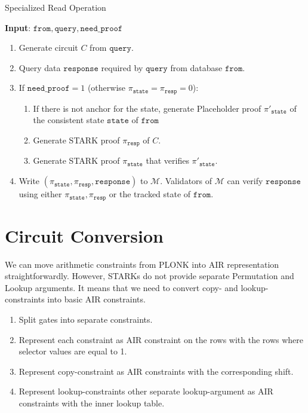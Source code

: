 \begin{algorithm}[h]
\caption{Specialized Read Operation}
\textbf{Input}: $\texttt{from}, \texttt{query}, \texttt{need\_proof}$
\begin{enumerate}
	\item Generate circuit $C$ from $\texttt{query}$.
	\item Query data $\texttt{response}$ required by $\texttt{query}$ from database $\texttt{from}$.
	\item If $\texttt{need\_proof} = 1$ (otherwise $\pi_{\texttt{state}} = \pi_{\texttt{resp}} = 0$):
	\begin{enumerate}
		\item If there is not anchor for the state, 
            generate Placeholder proof $\pi'_{\texttt{state}}$ of the consistent state $\texttt{state}$ of $\texttt{from}$
		\item Generate STARK proof $\pi_{\texttt{resp}}$ of $C$.
		\item Generate STARK proof $\pi_{\texttt{state}}$ that verifies $\pi'_{\texttt{state}}$.
	\end{enumerate}
	\item Write $(\pi_{\texttt{state}}, \pi_{\texttt{resp}}, \texttt{response})$ to $\mathcal{M}$.
			Validators of $\mathcal{M}$ can verify $\texttt{response}$ using either $\pi_{\texttt{state}}, \pi_{\texttt{resp}}$ or the tracked state of $\texttt{from}$. 
\end{enumerate}
\end{algorithm}

\section{Circuit Conversion}

We can move arithmetic constraints from PLONK into AIR representation straightforwardly. 
However, STARKs do not provide separate Permutation and Lookup arguments.
It means that we need to convert copy- and lookup-constraints into 
basic AIR constraints.  
\begin{enumerate}
    \item Split gates into separate constraints.
    \item Represent each constraint as AIR constraint on the rows with the rows where selector values are equal to 1.
    \item Represent copy-constraint as AIR constraints with the corresponding shift. 
    \item Represent lookup-constraints other separate lookup-argument as AIR constraints with the inner lookup table. 
\end{enumerate}
